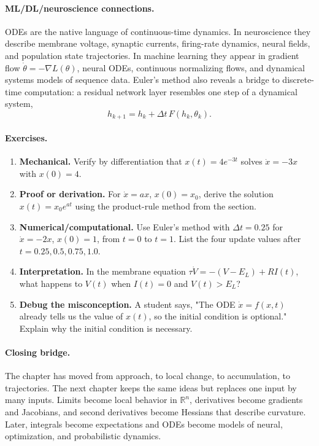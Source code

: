 \paragraph{ML/DL/neuroscience connections.}
ODEs are the native language of continuous-time dynamics. In neuroscience they describe membrane voltage, synaptic currents, firing-rate dynamics, neural fields, and population state trajectories. In machine learning they appear in gradient flow \(\dot\theta=-\nabla L(\theta)\), neural ODEs, continuous normalizing flows, and dynamical systems models of sequence data. Euler's method also reveals a bridge to discrete-time computation: a residual network layer resembles one step of a dynamical system,
\[
h_{k+1}=h_k+\Delta t\,F(h_k,\theta_k).
\]

\paragraph{Exercises.}
\begin{enumerate}[label=\textbf{8.4.\arabic*.}, leftmargin=*]
\item \textbf{Mechanical.} Verify by differentiation that \(x(t)=4e^{-3t}\) solves \(\dot x=-3x\) with \(x(0)=4\).
\item \textbf{Proof or derivation.} For \(\dot x=ax\), \(x(0)=x_0\), derive the solution \(x(t)=x_0e^{at}\) using the product-rule method from the section.
\item \textbf{Numerical/computational.} Use Euler's method with \(\Delta t=0.25\) for \(\dot x=-2x\), \(x(0)=1\), from \(t=0\) to \(t=1\). List the four update values after \(t=0.25,0.5,0.75,1.0\).
\item \textbf{Interpretation.} In the membrane equation \(\tau\dot V=-(V-E_L)+RI(t)\), what happens to \(V(t)\) when \(I(t)=0\) and \(V(t)>E_L\)?
\item \textbf{Debug the misconception.} A student says, "The ODE \(\dot x=f(x,t)\) already tells us the value of \(x(t)\), so the initial condition is optional." Explain why the initial condition is necessary.
\end{enumerate}

\paragraph{Closing bridge.}
The chapter has moved from approach, to local change, to accumulation, to trajectories. The next chapter keeps the same ideas but replaces one input by many inputs. Limits become local behavior in \(\mathbb{R}^n\), derivatives become gradients and Jacobians, and second derivatives become Hessians that describe curvature. Later, integrals become expectations and ODEs become models of neural, optimization, and probabilistic dynamics.

\clearpage
